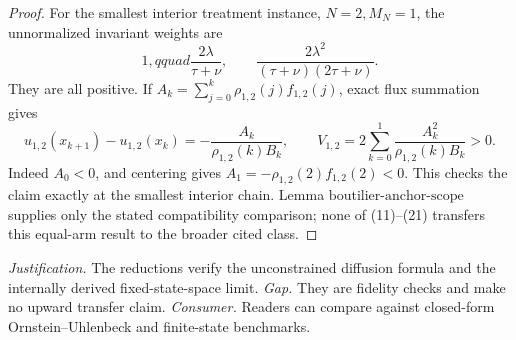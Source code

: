 \documentclass{article}
\begin{document}
\begin{proof}
For the smallest interior treatment instance, \(N=2,M_N=1\), the unnormalized invariant weights are
\[
 1,qquad \frac{2\lambda}{\tau+\nu},
 \qquad\frac{2\lambda^2}{(\tau+\nu)(2\tau+\nu)}.            \tag{20}
\]
They are all positive.  If \(A_k=\sum_{j=0}^k\rho_{1,2}(j)f_{1,2}(j)\), exact flux summation gives
\[
 u_{1,2}(x_{k+1})-u_{1,2}(x_k)
 =-\frac{A_k}{\rho_{1,2}(k)B_k},
 \qquad
 V_{1,2}=2\sum_{k=0}^1\frac{A_k^2}{\rho_{1,2}(k)B_k}>0.       \tag{21}
\]
Indeed \(A_0<0\), and centering gives \(A_1=-\rho_{1,2}(2)f_{1,2}(2)<0\).  This checks the claim exactly at the smallest interior chain.  Lemma \(\mathrm{boutilier\mbox{-}anchor\mbox{-}scope}\) supplies only the stated compatibility comparison; none of (11)--(21) transfers this equal-arm result to the broader cited class.
\end{proof}
\par\smallskip\noindent \textit{Justification.} The reductions verify the unconstrained diffusion formula and the internally derived fixed-state-space limit. \textit{Gap.} They are fidelity checks and make no upward transfer claim. \textit{Consumer.} Readers can compare against closed-form Ornstein--Uhlenbeck and finite-state benchmarks.
\end{document}
